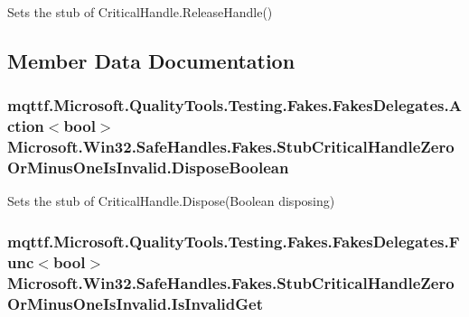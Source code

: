 Sets the stub of Critical\-Handle.\-Release\-Handle()



\subsection{Member Data Documentation}
\hypertarget{class_microsoft_1_1_win32_1_1_safe_handles_1_1_fakes_1_1_stub_critical_handle_zero_or_minus_one_is_invalid_aeb363c0be45e40910343f074368523de}{
\subsubsection[{Dispose\-Boolean}]{\setlength{\rightskip}{0pt plus 5cm}mqttf.\-Microsoft.\-Quality\-Tools.\-Testing.\-Fakes.\-Fakes\-Delegates.\-Action$<$bool$>$ Microsoft.\-Win32.\-Safe\-Handles.\-Fakes.\-Stub\-Critical\-Handle\-Zero\-Or\-Minus\-One\-Is\-Invalid.\-Dispose\-Boolean}}\label{class_microsoft_1_1_win32_1_1_safe_handles_1_1_fakes_1_1_stub_critical_handle_zero_or_minus_one_is_invalid_aeb363c0be45e40910343f074368523de}


Sets the stub of Critical\-Handle.\-Dispose(\-Boolean disposing)

\hypertarget{class_microsoft_1_1_win32_1_1_safe_handles_1_1_fakes_1_1_stub_critical_handle_zero_or_minus_one_is_invalid_aeea852777f80d9472c3d7b8824a1fb3e}{
\subsubsection[{Is\-Invalid\-Get}]{\setlength{\rightskip}{0pt plus 5cm}mqttf.\-Microsoft.\-Quality\-Tools.\-Testing.\-Fakes.\-Fakes\-Delegates.\-Func$<$bool$>$ Microsoft.\-Win32.\-Safe\-Handles.\-Fakes.\-Stub\-Critical\-Handle\-Zero\-Or\-Minus\-One\-Is\-Invalid.\-Is\-Invalid\-Get}}\label{class_microsoft_1_1_win32_1_1_safe_handles_1_1_fakes_1_1_stub_critical_handle_zero_or_minus_one_is_invalid_aeea852777f80d9472c3d7b8824a1fb3e}


